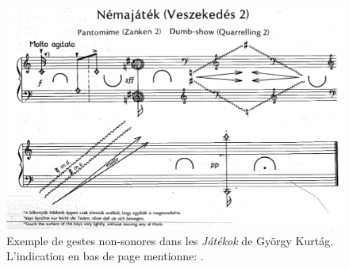 \begin{itemize}[noitemsep]
\begin{figure}[!htbp]
	\begin{flushright}
		\begin{minipage}[t]{0.93\linewidth}
			\captionsetup{format=plain}%
			\includegraphics[width=\linewidth]{gfx/03_gesture/Kurtag-Jatekok.png}
			\caption[Exemple de gestes non-sonores dans les \textit{Játékok} de György Kurtág]{Exemple de gestes non-sonores dans les \textit{Játékok} de György Kurtág. L'indication en bas de page mentionne: .}
			\label{fig:gesture:Kurtag-Jatekok}
		\end{minipage}
	\end{flushright}
\end{figure}


\end{itemize}
